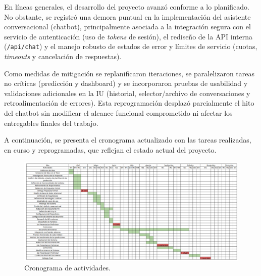 
En líneas generales, el desarrollo del proyecto avanzó conforme a lo planificado. No obstante, se registró una demora puntual en la implementación del asistente conversacional (chatbot), principalmente asociada a la integración segura con el servicio de autenticación (uso de \textit{tokens} de sesión), el rediseño de la API interna (\texttt{/api/chat}) y el manejo robusto de estados de error y límites de servicio (cuotas, \textit{timeouts} y cancelación de respuestas).

Como medidas de mitigación se replanificaron iteraciones, se paralelizaron tareas no críticas (predicción y dashboard) y se incorporaron pruebas de usabilidad y validaciones adicionales en la IU (historial, selector/archivo de conversaciones y retroalimentación de errores). Esta reprogramación desplazó parcialmente el hito del chatbot sin modificar el alcance funcional comprometido ni afectar los entregables finales del trabajo.

A continuación, se presenta el cronograma actualizado con las tareas realizadas, en curso y reprogramadas, que reflejan el estado actual del proyecto.

\begin{figure}[ht]
    \centering
    \includegraphics[width=0.7\textheight]{./././images/Cronograma.png}
    \caption{Cronograma de actividades.}
\end{figure}